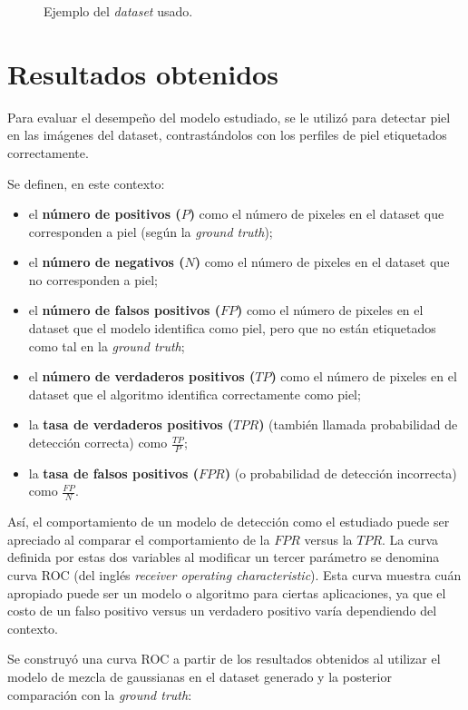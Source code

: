 \documentclass[12pt]{article}
\begin{document}
\begin{figure}[H]
    \caption{Ejemplo del \emph{dataset} usado.}
\end{figure}

\section{Resultados obtenidos}

Para evaluar el desempeño del modelo estudiado, se le utilizó para detectar piel
en las imágenes del dataset, contrastándolos con los perfiles de piel
etiquetados correctamente. 

Se definen, en este contexto: 

\begin{itemize}
    \item el \textbf{número de positivos ($P$)} como el número de pixeles en el dataset
        que corresponden a piel (según la \emph{ground truth});
    \item el \textbf{número de negativos ($N$)} como el número de pixeles en el dataset
        que no corresponden a piel;
    \item el \textbf{número de falsos positivos ($FP$)} como el número de
        pixeles en el dataset que el modelo identifica como piel, pero que no
        están etiquetados como tal en la \emph{ground truth};
    \item el \textbf{número de verdaderos positivos ($TP$)} como el número de
        pixeles en el dataset que el algoritmo identifica correctamente como
        piel;
    \item la \textbf{tasa de verdaderos positivos ($TPR$)} (también llamada
        probabilidad de detección correcta) como $\frac{TP}{P}$;
    \item la \textbf{tasa de falsos positivos ($FPR$)} (o probabilidad de
        detección incorrecta) como $\frac{FP}{N}$.
\end{itemize}

Así, el comportamiento de un modelo de detección como el estudiado puede ser
apreciado al comparar el comportamiento de la $FPR$ versus la $TPR$. La curva
definida por estas dos variables al modificar un tercer parámetro se denomina curva
ROC (del inglés \emph{receiver operating characteristic}). Esta curva muestra
cuán apropiado puede ser un modelo o algoritmo para ciertas aplicaciones, ya que
el costo de un falso positivo versus un verdadero positivo varía dependiendo del
contexto.

Se construyó una curva ROC a partir de los resultados obtenidos al utilizar el modelo de mezcla
de gaussianas en el dataset generado y la posterior comparación con la
\emph{ground truth}:
\end{document}
